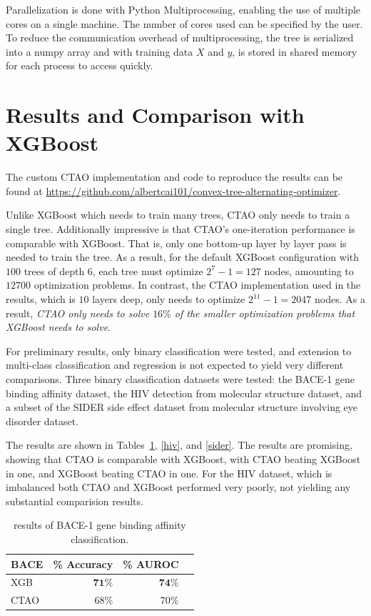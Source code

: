 \documentclass{article}
\begin{document}
Parallelization is done with Python Multiprocessing, enabling the use of multiple cores on a single machine. The number of cores used can be specified by the user.
To reduce the communication overhead of multiprocessing, the tree is serialized into a numpy array and with training data $X$ and $y$, is stored in shared memory for each process to access quickly.

\section{Results and Comparison with XGBoost}

The custom CTAO implementation and code to reproduce the results can be found at \url{https://github.com/albertcai101/convex-tree-alternating-optimizer}.

Unlike XGBoost which needs to train many trees, CTAO only needs to train a single tree. Additionally impressive is that CTAO's one-iteration performance is comparable with XGBoost.
That is, only one bottom-up layer by layer pass is needed to train the tree. As a result, for the default XGBoost configuration with $100$ trees of depth $6$, each tree must optimize
$2^7 - 1 = 127$ nodes, amounting to $12700$ optimization problems. In contrast, the CTAO implementation used in the results, which is $10$ layers deep, only needs to optimize
$2^{11} - 1 = 2047$ nodes. As a result, \emph{CTAO only needs to solve $16\%$ of the smaller optimization problems that XGBoost needs to solve}.

For preliminary results, only binary classification were tested, and extension to multi-class classification and regression is not expected to yield very different comparisons.
Three binary classification datasets were tested: the BACE-1 gene binding affinity dataset, the HIV detection from molecular structure dataset, and a subset of the SIDER side effect dataset
from molecular structure involving eye disorder dataset.

The results are shown in Tables~\ref{bace}, \ref{hiv}, and \ref{sider}. The results are promising, showing that CTAO is comparable with XGBoost, with CTAO beating XGBoost in one, and XGBoost beating CTAO in one.
For the HIV dataset, which is imbalanced both CTAO and XGBoost performed very poorly, not yielding any substantial comparision results.

\begin{table}[H]
  \centering
  \begin{tabular}{l r r c}
    \toprule
    \textbf{BACE} & \textbf{\% Accuracy} & \textbf{\% AUROC} \\
    \midrule
    XGB & $\boldsymbol{71\%}$ & $\boldsymbol{74\%}$ \\
    CTAO& {68\%} & {70\%} \\
    \bottomrule
  \end{tabular}
  \vspace{0.5cm}
  \caption{results of BACE-1 gene binding affinity classification.}
  \label{bace}
\end{table}
\end{document}
